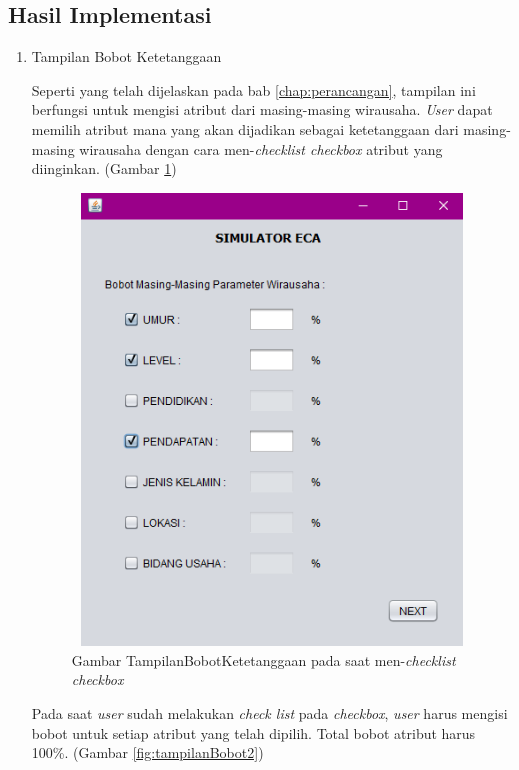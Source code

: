 \subsection{Hasil Implementasi}
\begin{enumerate}
	\item Tampilan Bobot Ketetanggaan
	
	
	Seperti yang telah dijelaskan pada bab \ref{chap:perancangan}, tampilan ini berfungsi untuk mengisi atribut dari masing-masing wirausaha. \textit{User} dapat memilih atribut mana yang akan dijadikan sebagai ketetanggaan dari masing-masing wirausaha dengan cara men-\textit{checklist checkbox} atribut yang diinginkan. (Gambar \ref{fig:tampilanBobot1})
	
	
	\begin{figure} [H]
	\centering  
	\includegraphics[width=12cm, height=12cm]{tampilanImplementasiBobot} 
		\caption[Gambar TampilanBobotKetetanggaan]{Gambar TampilanBobotKetetanggaan pada saat men-\textit{checklist checkbox}}
	\label{fig:tampilanBobot1} 
\end{figure}

	Pada saat \textit{user} sudah melakukan \textit{check list} pada \textit{checkbox}, \textit{user} harus mengisi bobot untuk setiap atribut yang telah dipilih. Total bobot atribut harus 100\%. (Gambar \ref{fig:tampilanBobot2})
	

\end{enumerate}
